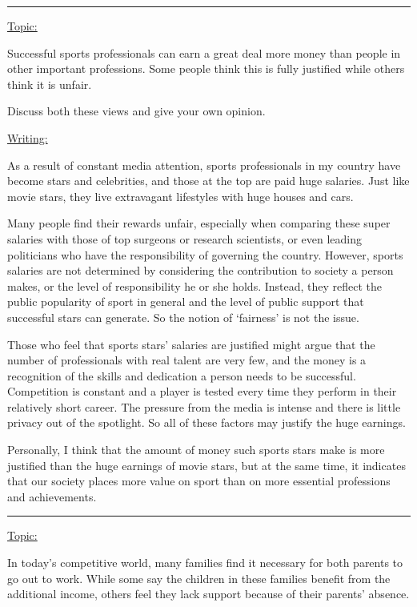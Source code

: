 \documentclass[UTF8]{ctexart}
\begin{document}
\noindent\rule[0.5ex]{\linewidth}{0.25pt}
\LARGE{\underline{Topic:}}

\normalsize{Successful sports professionals can earn a great deal more money than people in other important professions.
Some people think this is fully justified while others think it is unfair.

Discuss both these views and give your own opinion.}

\noindent
\LARGE{\underline{Writing:}}

\normalsize{As a result of constant media attention, sports professionals in my country have become stars and celebrities, and those at the top are paid huge salaries. Just like movie stars, they live extravagant lifestyles with huge houses and cars.

Many people find their rewards unfair, especially when comparing these super salaries with those of top surgeons or research scientists, or even leading politicians who have the responsibility of governing the country. However, sports salaries are not determined by considering the contribution to society a person makes, or the level of responsibility he or she holds. Instead, they reflect the public popularity of sport in general and the level of public support that successful stars can generate. So the notion of ‘fairness’ is not the issue.

Those who feel that sports stars’ salaries are justified might argue that the number of professionals with real talent are very few, and the money is a recognition of the skills and dedication a person needs to be successful. Competition is constant and a player is tested every time they perform in their relatively short career. The pressure from the media is intense and there is little privacy out of the spotlight. So all of these factors may justify the huge earnings.

Personally, I think that the amount of money such sports stars make is more justified than the huge earnings of movie stars, but at the same time, it indicates that our society places more value on sport than on more essential professions and achievements.}

\noindent\rule[0.5ex]{\linewidth}{0.25pt}
\LARGE{\underline{Topic:}}

\normalsize{In today's competitive world, many families find it necessary for both parents to go out to work. While some say the children in these families benefit from the additional income, others feel they lack support because of their parents' absence.}
\end{document}
